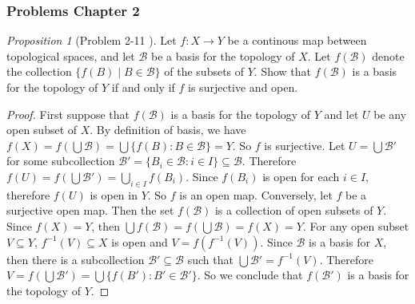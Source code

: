 \documentclass[a4paper]{article}
\theoremstyle{remark}
\newtheorem{prop}{Proposition}
\newcommand{\subhim}{\subseteq} %
\begin{document}
\subsubsection*{Problems Chapter 2}
\begin{prop}[Problem 2-11 \cite{LeeTM}]
	Let $f : X \to Y$ be a continous map between topological spaces, and let $\mathcal{B}$ be a basis for the topology of $X$. Let $f(\mathcal{B})$ denote the collection $\{ f(B) \mid B \in \mathcal{B}\}$ of the subsets of $Y$. Show that $f(\mathcal{B})$ is a basis for the topology of $Y$ if and only if $f$ is surjective and open.
\end{prop}
\begin{proof}
	First suppose that $f(\mathcal{B})$ is a basis for the topology of $Y$ and let $U$ be any open subset of $X$. By definition of basis, we have $f(X) = f(\bigcup \mathcal{B}) = \bigcup \{f(B) : B \in \mathcal{B} \} = Y$. So $f$ is surjective. Let $U = \bigcup \mathcal{B'}$ for some subcollection $\mathcal{B}' = \{B_i \in \mathcal{B} : i \in I \} \subhim \mathcal{B}$. Therefore $f(U) = f(\bigcup \mathcal{B'}) = \bigcup_{i\in I} f(B_i)$. Since $f(B_i)$ is open for each $i \in I$, therefore $f(U)$ is open in $Y$. So $f$ is an open map.
	Conversely, let $f$ be a surjective open map. Then the set $f(\mathcal{B})$ is a collection of open subsets of $Y$. Since $f(X) = Y$, then $\bigcup f(\mathcal{B}) = f(\bigcup \mathcal{B})= f(X) = Y$. For any open subset $V \subhim Y$, $f^{-1}(V) \subhim X$ is open and $V = f(f^{-1}(V))$. Since $\mathcal{B}$ is a basis for $X$, then there is a subcollection $\mathcal{B}' \subhim \mathcal{B}$ such that $\bigcup \mathcal{B'} = f^{-1}(V)$. Therefore $V = f(\bigcup \mathcal{B'}) = \bigcup \{f(B') : B' \in \mathcal{B'}\}$. So we conclude that $f(\mathcal{B'})$ is a basis for the topology of $Y$.
\end{proof}
\end{document}
